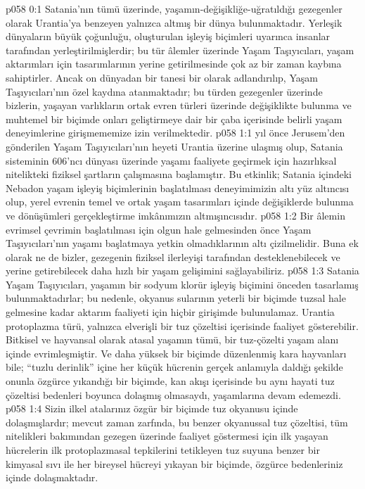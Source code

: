 \vs p058 0:1 Satania’nın tümü üzerinde, yaşamın\hyp{}değişikliğe\hyp{}uğratıldığı gezegenler olarak Urantia’ya benzeyen yalnızca altmış bir dünya bulunmaktadır. Yerleşik dünyaların büyük çoğunluğu, oluşturulan işleyiş biçimleri uyarınca insanlar tarafından yerleştirilmişlerdir; bu tür âlemler üzerinde Yaşam Taşıyıcıları, yaşam aktarımları için tasarımlarının yerine getirilmesinde çok az bir zaman kaybına sahiptirler. Ancak on dünyadan bir tanesi bir  olarak adlandırılıp, Yaşam Taşıyıcıları’nın özel kaydına atanmaktadır; bu türden gezegenler üzerinde bizlerin, yaşayan varlıkların ortak evren türleri üzerinde değişiklikte bulunma ve muhtemel bir biçimde onları geliştirmeye dair bir çaba içerisinde belirli yaşam deneyimlerine girişmememize izin verilmektedir.
\vs p058 1:1  yıl önce Jerusem’den gönderilen Yaşam Taşıyıcıları’nın heyeti Urantia üzerine ulaşmış olup, Satania sisteminin 606’ncı dünyası üzerinde yaşamı faaliyete geçirmek için hazırlıksal nitelikteki fiziksel şartların çalışmasına başlamıştır. Bu etkinlik; Satania içindeki Nebadon yaşam işleyiş biçimlerinin başlatılması deneyimimizin altı yüz altıncısı olup, yerel evrenin temel ve ortak yaşam tasarımları içinde değişiklerde bulunma ve dönüşümleri gerçekleştirme imkânımızın altmışıncısıdır.
\vs p058 1:2 Bir âlemin evrimsel çevrimin başlatılması için olgun hale gelmesinden önce Yaşam Taşıyıcıları’nın yaşamı başlatmaya yetkin olmadıklarının altı çizilmelidir. Buna ek olarak ne de bizler, gezegenin fiziksel ilerleyişi tarafından desteklenebilecek ve yerine getirebilecek daha hızlı bir yaşam gelişimini sağlayabiliriz.
\vs p058 1:3 Satania Yaşam Taşıyıcıları, yaşamın bir sodyum klorür işleyiş biçimini önceden tasarlamış bulunmaktadırlar; bu nedenle, okyanus sularının yeterli bir biçimde tuzsal hale gelmesine kadar aktarım faaliyeti için hiçbir girişimde bulunulamaz. Urantia protoplazma türü, yalnızca elverişli bir tuz çözeltisi içerisinde faaliyet gösterebilir. Bitkisel ve hayvansal olarak atasal yaşamın tümü, bir tuz\hyp{}çözelti yaşam alanı içinde evrimleşmiştir. Ve daha yüksek bir biçimde düzenlenmiş kara hayvanları bile; “tuzlu derinlik” içine her küçük hücrenin gerçek anlamıyla daldığı şekilde onunla özgürce yıkandığı bir biçimde, kan akışı içerisinde bu aynı hayati tuz çözeltisi bedenleri boyunca dolaşmış olmasaydı, yaşamlarına devam edemezdi.
\vs p058 1:4 Sizin ilkel atalarınız özgür bir biçimde tuz okyanusu içinde dolaşmışlardır; mevcut zaman zarfında, bu benzer okyanussal tuz çözeltisi, tüm nitelikleri bakımından gezegen üzerinde faaliyet göstermesi için ilk yaşayan hücrelerin ilk protoplazmasal tepkilerini tetikleyen tuz suyuna benzer bir kimyasal sıvı ile her bireysel hücreyi yıkayan bir biçimde, özgürce bedenleriniz içinde dolaşmaktadır.
